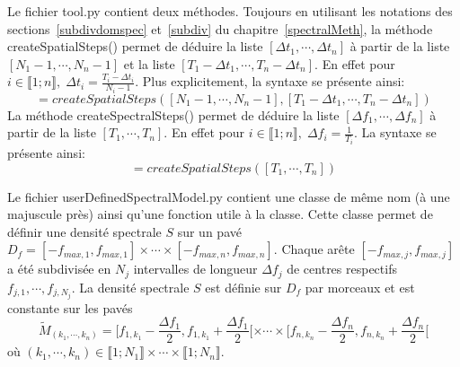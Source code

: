 Le fichier tool.py contient deux méthodes. Toujours en utilisant
les notations des sections~\ref{subdivdomspec} et~\ref{subdiv} du chapitre~\ref{spectralMeth},
la méthode createSpatialSteps()
permet de déduire la liste $[\Delta t_1, \cdots, \Delta t_n]$ à partir
de la liste $[N_1 - 1, \cdots, N_n -1]$ et la liste $[T_1 - \Delta t_1 , \cdots, T_n - \Delta t_n]$.
En effet pour $i \in \llbracket 1;n \rrbracket, \; \Delta t_i = \frac{T_i - \Delta t_i}{N_i - 1}$.
Plus explicitement, la syntaxe se présente ainsi:
\begin{equation*} [\Delta t_1, \cdots, \Delta t_n] = createSpatialSteps([N_1 - 1, \cdots, N_n -1], [T_1 - \Delta t_1 , \cdots, T_n - \Delta t_n]) \end{equation*}
\noindent La méthode createSpectralSteps() permet de déduire la liste $[\Delta f_1, \cdots, \Delta f_n]$ à
partir de  la liste $[T_1, \cdots, T_n]$. En effet pour $i \in \llbracket 1;n \rrbracket, \; \Delta f_i = \frac{1}{T_i}$.
La syntaxe se présente ainsi:
\begin{equation*} [\Delta f_1, \cdots, \Delta f_n] = createSpatialSteps([T_1, \cdots, T_n]) \end{equation*}


Le fichier userDefinedSpectralModel.py contient une classe de même nom (à une majuscule près) ainsi qu'une fonction utile à la classe.
Cette classe permet de définir une densité spectrale $S$ sur un pavé $D_f = [-f_{max,1}, f_{max,1}] \times \cdots \times [-f_{max,n}, f_{max,n}]$.
Chaque arête $[-f_{max,j}, f_{max,j}]$ a été subdivisée en $N_j$ intervalles de longueur $\Delta f_j$
de centres respectifs $f_{j,1}, \cdots, f_{j,N_j}$. La densité spectrale $S$ est définie
sur $D_f$ par morceaux et est constante sur les pavés
\begin{equation*}
\tilde{M}_{(k_1,\cdots,k_n)} = [f_{1,k_1} -\frac{\Delta f_1}{2}, f_{1,k_1} + \frac{\Delta f_1}{2} [ \times \cdots \times [f_{n,k_n} -\frac{\Delta f_n}{2}, f_{n,k_n} + \frac{\Delta f_n}{2}[
\end{equation*}
où $(k_1,\cdots,k_n) \in \llbracket 1;N_1 \rrbracket \times \cdots \times \llbracket 1;N_n \rrbracket $.\\

